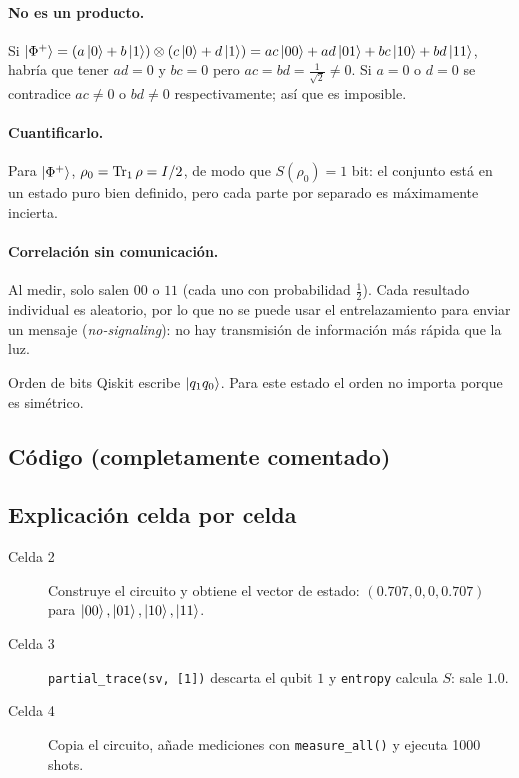 \paragraph{No es un producto.} Si $\left|\Phi^+\right\rangle=(a\left|0\right\rangle+b\left|1\right\rangle)\otimes
(c\left|0\right\rangle+d\left|1\right\rangle)=ac\left|00\right\rangle+ad\left|01\right\rangle+bc\left|10\right\rangle+bd\left|11\right\rangle$, habría que tener
$ad=0$ y $bc=0$ pero $ac=bd=\tfrac1{\sqrt2}\neq0$. Si $a=0$ o $d=0$ se
contradice $ac\ne0$ o $bd\ne0$ respectivamente; así que es imposible.

\paragraph{Cuantificarlo.} Para $\left|\Phi^+\right\rangle$, $\rho_0=\operatorname{Tr}_1\rho=I/2$, de
modo que $S(\rho_0)=1$ bit: el conjunto está en un estado puro bien definido,
pero cada parte por separado es máximamente incierta.

\paragraph{Correlación sin comunicación.} Al medir, solo salen $00$ o $11$ (cada
uno con probabilidad $\tfrac12$). Cada resultado individual es aleatorio, por
lo que no se puede usar el entrelazamiento para enviar un mensaje
(\emph{no-signaling}): no hay transmisión de información más rápida que la
luz.

\begin{nota}{Orden de bits}
Qiskit escribe $\left|q_1q_0\right\rangle$. Para este estado el orden no importa porque es
simétrico.
\end{nota}

\subsection{Código (completamente comentado)}


\subsection{Explicación celda por celda}
\begin{description}
  \item[Celda 2] Construye el circuito y obtiene el vector de estado:
    $(0.707,0,0,0.707)$ para $\left|00\right\rangle,\left|01\right\rangle,\left|10\right\rangle,\left|11\right\rangle$.
  \item[Celda 3] \texttt{partial\_trace(sv, [1])} descarta el qubit $1$ y
    \texttt{entropy} calcula $S$: sale $1.0$.
  \item[Celda 4] Copia el circuito, añade mediciones con
    \texttt{measure\_all()} y ejecuta 1000 shots.
\end{description}

